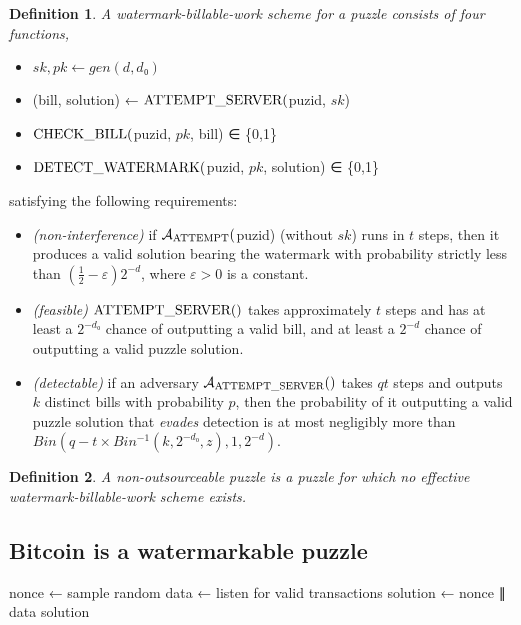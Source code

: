 \documentclass{article}
\newtheorem{definition}{Definition}
\newcommand{\hash}{\mathcal{H}}
\newcommand{\adv}{\mathcal{A}}
\newcommand{\tn}{\textnormal}
\newcommand{\unn}[1]{\uppercase\tn{#1}}
\begin{document}
\begin{definition}A watermark-billable-work scheme for a puzzle consists of four functions,
\end{definition}
\begin{itemize}
\item $sk,pk ← gen(d,d₀)$
\item (bill, solution) ← $\unn{attempt\_server}($puzid, $sk$)
\item $\unn{check\_bill}($puzid, $pk$, bill) ∈ \{0,1\}
\item $\unn{detect\_watermark}($puzid, $pk$, solution) ∈ \{0,1\}
\end{itemize}
satisfying the following requirements:
\begin{itemize}
\item {\em (non-interference)} if $\adv_{\unn{attempt}}($puzid) (without $sk$) runs in $t$ steps, then it produces a valid solution bearing the watermark with probability strictly less than $(\frac{1}{2}-ε)2^{-d}$, where $ε>0$ is a constant.
\item {\em (feasible)} $\unn{attempt\_server}()$ takes approximately $t$ steps and has at least a $2^{-d₀}$ chance of outputting a valid bill, and at least a $2^{-d}$ chance of outputting a valid puzzle solution.
\item {\em (detectable)} if an adversary $\adv_{\unn{attempt\_server}}()$ takes $qt$ steps and outputs $k$ distinct bills with probability $p$, then the probability of it outputting a valid puzzle solution that {\em evades} detection is at most negligibly more than $Bin(q-t×Bin^{-1}(k,2^{-d₀},z), 1, 2^{-d})$.
\end{itemize}

\begin{definition}
A non-outsourceable puzzle is a puzzle for which no effective watermark-billable-work scheme exists.
\end{definition}

\subsection{Bitcoin is a watermarkable puzzle}

\begin{algorithmic}[0]
    \State nonce ← sample random
    \State data ← listen for valid transactions
    \State solution ← nonce ∥ data
    \State \Return solution
  \EndFunction
  \State

    \State \Return {$\hash($puzid$ || $solution$) < 2^{-d}$}
  \EndFunction
\end{algorithmic}
\end{document}
